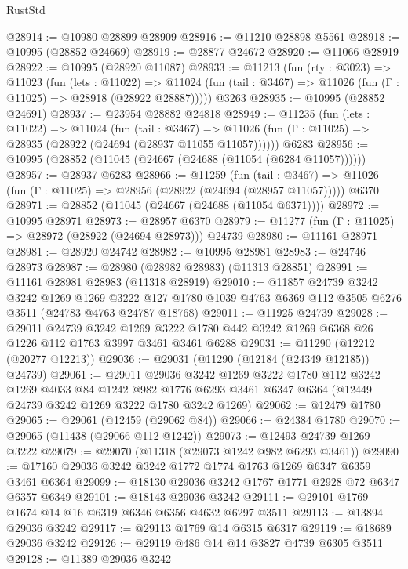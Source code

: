 \begin{lexlean}{RustStd}
\begin{coremodule}
@28914 := @10980 @28899 @28909
@28916 := @11210 @28898 @5561
@28918 := @10995 (@28852 @24669)
@28919 := @28877 @24672
@28920 := @11066 @28919
@28922 := @10995 (@28920 @11087)
@28933 := @11213
    (fun (rty : @3023) =>
    @11023
      (fun (lets : @11022) =>
      @11024 (fun (tail : @3467) => @11026 (fun (Γ : @11025) => @28918 (@28922 @28887)))))
    @3263
@28935 := @10995 (@28852 @24691)
@28937 := @23954 @28882 @24818
@28949 := @11235
    (fun (lets : @11022) =>
    @11024
      (fun (tail : @3467) =>
      @11026 (fun (Γ : @11025) => @28935 (@28922 (@24694 (@28937 @11055 @11057))))))
    @6283
@28956 := @10995 (@28852 (@11045 (@24667 (@24688 (@11054 (@6284 @11057))))))
@28957 := @28937 @6283
@28966 := @11259
    (fun (tail : @3467) => @11026 (fun (Γ : @11025) => @28956 (@28922 (@24694 (@28957 @11057)))))
    @6370
@28971 := @28852 (@11045 (@24667 (@24688 (@11054 @6371))))
@28972 := @10995 @28971
@28973 := @28957 @6370
@28979 := @11277 (fun (Γ : @11025) => @28972 (@28922 (@24694 @28973))) @24739
@28980 := @11161 @28971
@28981 := @28920 @24742
@28982 := @10995 @28981
@28983 := @24746 @28973
@28987 := @28980 (@28982 @28983) (@11313 @28851)
@28991 := @11161 @28981 @28983 (@11318 @28919)
@29010 := @11857
    @24739
    @3242
    @3242
    @1269
    @1269
    @3222
    @127
    @1780
    @1039
    @4763
    @6369
    @112
    @3505
    @6276
    @3511
    (@24783 @4763 @24787 @18768)
@29011 := @11925 @24739
@29028 := @29011
    @24739
    @3242
    @1269
    @3222
    @1780
    @442
    @3242
    @1269
    @6368
    @26
    @1226
    @112
    @1763
    @3997
    @3461
    @3461
    @6288
@29031 := @11290 (@12212 (@20277 @12213))
@29036 := @29031 (@11290 (@12184 (@24349 @12185)) @24739)
@29061 := @29011
    @29036
    @3242
    @1269
    @3222
    @1780
    @112
    @3242
    @1269
    @4033
    @84
    @1242
    @982
    @1776
    @6293
    @3461
    @6347
    @6364
    (@12449 @24739 @3242 @1269 @3222 @1780 @3242 @1269)
@29062 := @12479 @1780
@29065 := @29061 (@12459 (@29062 @84))
@29066 := @24384 @1780
@29070 := @29065 (@11438 (@29066 @112 @1242))
@29073 := @12493 @24739 @1269 @3222
@29079 := @29070 (@11318 (@29073 @1242 @982 @6293 @3461))
@29090 := @17160 @29036 @3242 @3242 @1772 @1774 @1763 @1269 @6347 @6359 @3461 @6364
@29099 := @18130 @29036 @3242 @1767 @1771 @2928 @72 @6347 @6357 @6349
@29101 := @18143 @29036 @3242
@29111 := @29101 @1769 @1674 @14 @16 @6319 @6346 @6356 @4632 @6297 @3511
@29113 := @13894 @29036 @3242
@29117 := @29113 @1769 @14 @6315 @6317
@29119 := @18689 @29036 @3242
@29126 := @29119 @486 @14 @14 @3827 @4739 @6305 @3511
@29128 := @11389 @29036 @3242

\end{coremodule}
\end{lexlean}
